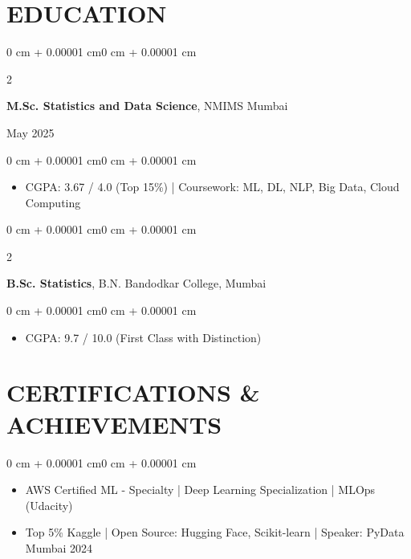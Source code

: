 \documentclass[10pt, letterpaper]{article}
\newenvironment{highlights}{
    \begin{itemize}[
        topsep=0.03 cm,
        parsep=0.02 cm,
        partopsep=0pt,
        itemsep=0.02 cm,
        leftmargin=0 cm + 8pt
    ]
}{
    \end{itemize}
}
\newenvironment{onecolentry}{
    \begin{adjustwidth}{0 cm + 0.00001 cm}{0 cm + 0.00001 cm}
}{
    \end{adjustwidth}
}
\newenvironment{twocolentry}[2][]{
    \onecolentry
    \def\secondColumn{#2}
    \setcolumnwidth{\fill, 3.5 cm}
    \begin{paracol}{2}
}{
    \switchcolumn \raggedleft \secondColumn
    \end{paracol}
    \endonecolentry
}
\begin{document}
    \section{EDUCATION}
    \begin{twocolentry}{May 2025}
        \textbf{M.Sc. Statistics and Data Science}, NMIMS Mumbai
    \end{twocolentry}
    \vspace{0.03 cm}
    \begin{onecolentry}
        \begin{highlights}
            \item CGPA: 3.67 / 4.0 (Top 15\%) | Coursework: ML, DL, NLP, Big Data, Cloud Computing
        \end{highlights}
    \end{onecolentry}
    \vspace{0.05 cm}
    \begin{twocolentry}{2023}
        \textbf{B.Sc. Statistics}, B.N. Bandodkar College, Mumbai
    \end{twocolentry}
    \vspace{0.03 cm}
    \begin{onecolentry}
        \begin{highlights}
            \item CGPA: 9.7 / 10.0 (First Class with Distinction)
        \end{highlights}
    \end{onecolentry}

    \section{CERTIFICATIONS \& ACHIEVEMENTS}
    \begin{onecolentry}
        \begin{highlights}
            \item AWS Certified ML - Specialty | Deep Learning Specialization | MLOps (Udacity)
            \item Top 5\% Kaggle | Open Source: Hugging Face, Scikit-learn | Speaker: PyData Mumbai 2024
        \end{highlights}
    \end{onecolentry}
\end{document}
